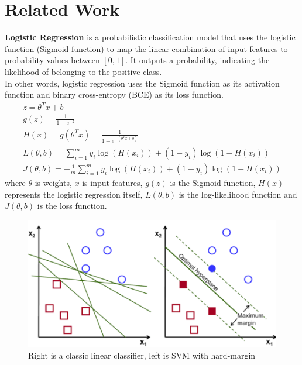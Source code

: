 \documentclass[10pt,twocolumn,letterpaper]{article}
\begin{document}
\section{Related Work}
\label{sec:related}

\noindent\textbf{Logistic Regression} is a probabilistic classification model that uses the logistic function (Sigmoid function) to map the linear combination of input features to probability values between $[0, 1]$.
It outputs a probability, indicating the likelihood of belonging to the positive class\cite{wright1995logistic}. \\
\indent In other words, logistic regression uses the Sigmoid function as its activation function and binary cross-entropy (BCE) as its loss function.
\begin{equation*}\label{eq:logistic}
	\begin{gathered}
		z = \theta^{T}{x}+b \\
		g(z) = \frac{1}{1+e^{-z}} \\
		H(x) = g(\theta^{T}{x}) = \frac{1}{1+e^{-(\theta^{T}{x}+b)}} \\
		L(\theta,b) = \sum^{m}_{i=1}y_{i}\log({H(x_{i})})+(1-y_{i})\log(1-H(x_i)) \\
		J(\theta,b) = -\frac{1}{m}\sum^{m}_{i=1}y_{i}\log({H(x_{i})})+(1-y_{i})\log(1-H(x_i))
	\end{gathered}
\end{equation*}
where $\theta$ is weights, $x$ is input features, $g(z)$ is the Sigmoid function, $H(x)$ represents the logistic regression itself, $L(\theta,b)$ is the log-likelihood function and $J(\theta,b)$ is the loss function.\\
\begin{figure}[t]
	\centering
	\includegraphics[width=\columnwidth]{svm-lr}
	\caption{Right is a classic linear classifier, left is SVM with hard-margin}
	\label{fig:svm-lr}
\end{figure}
\end{document}
